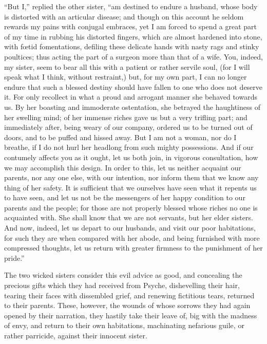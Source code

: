 \documentclass{article}
\begin{document}
``But I,'' replied the other sister, ``am destined to endure a husband, whose
body is distorted with an articular disease; and though on this account he
seldom rewards my pains with conjugal embraces, yet I am forced to spend a
great part of my time in rubbing his distorted fingers, which are almost
hardened into stone, with f{\oe}tid fomentations, defiling these delicate hands
with nasty rags and stinky poultices; thus acting the part of a surgeon more
than that of a wife. You, indeed, my sister, seem to bear all this with a
patient or rather servile soul, (for I will speak what I think, without
restraint,) but, for my own part, I can no longer endure that such a blessed
destiny should have fallen to one who does not deserve it. For only recollect
in what a proud and arrogant manner she behaved towards us. By her boasting and
immoderate ostentation, she betrayed the haughtiness of her swelling mind; of
her immense riches gave us but a very trifling part; and immediately after,
being weary of our company, ordered us to be turned out of doors, and to be
puffed and hissed away. But I am not a woman, nor do I breathe, if I do not
hurl her headlong from such mighty possessions. And if our contumely affects
you as it ought, let us both join, in vigorous consultation, how we may
accomplish this design. In order to this, let us neither acquaint our parents,
nor any one else, with our intention, nor inform them that we know any thing of
her safety. It is sufficient that we ourselves have seen what it repents us to
have seen, and let us not be the messengers of her happy condition to our
parents and the people; for those are not properly blessed whose riches no one
is acquainted with. She shall know that we are not servants, but her elder
sisters. And now, indeed, let us depart to our husbands, and visit our poor
habitations, for such they are when compared with her abode, and being
furnished with more compressed thoughts, let us return with greater firmness to
the punishment of her pride.''

The two wicked sisters consider this evil advice as good, and concealing the
precious gifts which they had received from Psyche, dishevelling their hair,
tearing their faces with dissembled grief, and renewing fictitious tears,
returned to their parents. These, however, the wounds of whose sorrows they had
again opened by their narration, they hastily take their leave of, big with the
madness of envy, and return to their own habitations, machinating nefarious
guile, or rather parricide, against their innocent sister.
\end{document}
